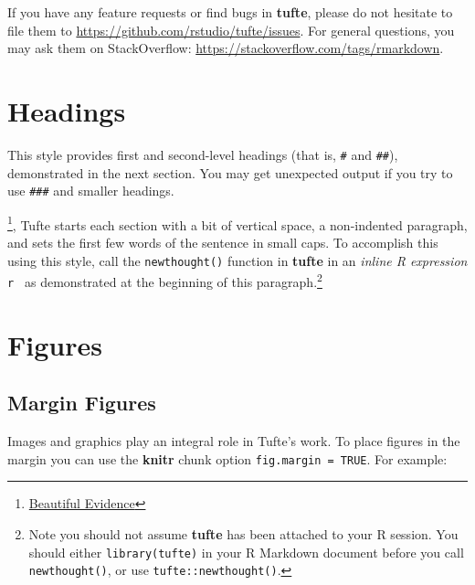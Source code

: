 \documentclass[a4paper,14pt]{tufte-handout}
\begin{document}
If you have any feature requests or find bugs in \textbf{tufte}, please
do not hesitate to file them to
\url{https://github.com/rstudio/tufte/issues}. For general questions,
you may ask them on StackOverflow:
\url{https://stackoverflow.com/tags/rmarkdown}.

\hypertarget{headings}{%
\section{Headings}\label{headings}}

This style provides first and second-level headings (that is,
\texttt{\#} and \texttt{\#\#}), demonstrated in the next section. You
may get unexpected output if you try to use \texttt{\#\#\#} and smaller
headings.

\footnote{\href{https://www.edwardtufte.com/tufte/books_be}{Beautiful
  Evidence}}, Tufte starts each section with a bit of vertical space, a
non-indented paragraph, and sets the first few words of the sentence in
small caps. To accomplish this using this style, call the
\texttt{newthought()} function in \textbf{tufte} in an \emph{inline R
expression} \texttt{\textasciigrave{}r\ \textasciigrave{}} as
demonstrated at the beginning of this paragraph.\footnote{Note you
  should not assume \textbf{tufte} has been attached to your R session.
  You should either \texttt{library(tufte)} in your R Markdown document
  before you call \texttt{newthought()}, or use
  \texttt{tufte::newthought()}.}

\hypertarget{figures}{%
\section{Figures}\label{figures}}

\hypertarget{margin-figures}{%
\subsection{Margin Figures}\label{margin-figures}}

Images and graphics play an integral role in Tufte's work. To place
figures in the margin you can use the \textbf{knitr} chunk option
\texttt{fig.margin\ =\ TRUE}. For example:
\end{document}
